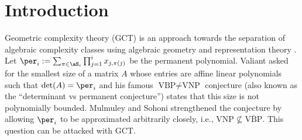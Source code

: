






























































































\section{Introduction}
\label{sec:intro}
Geometric complexity theory (GCT) is an approach towards the separation of algebraic complexity classes using algebraic geometry and representation theory \cite{gct1, gct2, BLMW:11}.
Let $\per_i := \sum_{\pi\in\aS_i} \prod_{j=1}^i x_{j,\pi(j)}$ be the permanent polynomial. Valiant 
asked for the smallest size of a matrix $A$ whose entries are affine linear polynomials such that $\det(A)=\per_i$ and his famous $\text{VBP}\neq\text{VNP}$ conjecture (also known as the ``determinant vs permanent conjecture'') states that this size is not polynomially bounded.
%
%
%
Mulmuley and Sohoni strengthened the conjecture by allowing $\per_i$ to be approximated arbitrarily closely, i.e., $\text{VNP}\not\subseteq\overline{\text{VBP}}$.
This question can be attacked with GCT.

